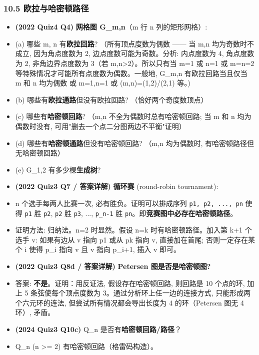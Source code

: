 \documentclass[10pt,a4paper,openany]{ctexbook}
\theoremstyle{definition}
\theoremstyle{remark}
\begin{document}
\subsubsection{10.5 欧拉与哈密顿路径}

\begin{itemize}
\item \textbf{(2022 Quiz4 Q4)} \textbf{网格图 G\_{m,n}}（m 行 n 列的矩形网格）:
\item (a) 哪些 m, n 有\textbf{欧拉回路}? （所有顶点度数为偶数 —— 当 m,n 均为奇数时不成立, 因为角点度数为 2, 边点度数可能为奇数。分析: 内点度数为 4, 角点度数为 2, 非角边界点度数为 3（若 m,n>2）。所以只有当 m=1 或 n=1 或 m=n=2 等特殊情况才可能所有点度数为偶数。一般地, G\_{m,n} 有欧拉回路当且仅当 m 和 n 均为偶数 或 m=1,n=1 或 (m,n)=(1,2)/(2,1) 等。)
\item (b) 哪些有\textbf{欧拉通路}但没有欧拉回路? （恰好两个奇度数顶点）
\item (c) 哪些有\textbf{哈密顿回路}? （m,n 不全为偶数时总有哈密顿回路; 当 m 和 n 均为偶数时没有, 可用"删去一个点二分图两边不平衡"证明）
\item (d) 哪些有\textbf{哈密顿通路}但没有哈密顿回路? （m,n 均为偶数时, 有哈密顿路径但无哈密顿回路）
\item (e) G\_{1,2} 有多少棵\textbf{生成树}?

\item \textbf{(2022 Quiz3 Q7 / 答案详解)} \textbf{循环赛} (round-robin tournament):
\item n 个选手每两人比赛一次, 必有胜负。证明可以排成序列 \texttt{p1, p2, ..., pn} 使得 \texttt{p1} 胜 \texttt{p2}, \texttt{p2} 胜 \texttt{p3}, ..., \texttt{p\_{n-1}} 胜 \texttt{pn}。即\textbf{竞赛图中必存在哈密顿路径}。
\item 证明方法: 归纳法。n=2 时显然。假设 n=k 时有哈密顿路径。加入第 k+1 个选手 v: 如果有边从 v 指向 p1 或从 pk 指向 v, 直接加在首尾; 否则一定存在某个 i 使得 p\_i 指向 v 且 v 指向 p\_{i+1}, 插入 v 即可。

\item \textbf{(2022 Quiz3 Q8d / 答案详解)} \textbf{Petersen 图是否是哈密顿图?}
\item 答案: \textbf{不是}。证明：用反证法, 假设存在哈密顿回路, 则回路是 10 个点的环, 加上 5 条弦使每个顶点度数为 3。通过分析环上任一边的连接方式, 只能形成两个六元环的连法, 但尝试所有情况都会导出长度为 4 的环（Petersen 图无 4 环）, 矛盾。

\item \textbf{(2024 Quiz3 Q10c)} Q\_n 是否有\textbf{哈密顿回路/路径}？
\item Q\_n (n >= 2) 有哈密顿回路（格雷码构造）。

\end{itemize}
\end{document}
